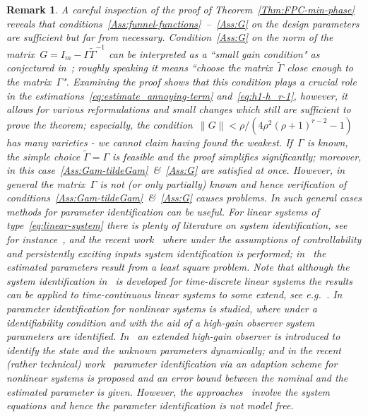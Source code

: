 \documentclass[ envcountsect, envcountsame]{svjour3}
\newtheorem{Remark}[Theorem]{Remark}
\begin{document}
\begin{Remark}
A careful inspection of the proof of Theorem~\ref{Thm:FPC-min-phase} reveals that conditions~\ref{Ass:funnel-functions}~--~\ref{Ass:G} on the design parameters
are sufficient but far from necessary.
Condition~\ref{Ass:G} on the norm of the matrix~${G = I_m -  \Gamma \tilde \Gamma^{-1}}$ can be interpreted as a ``small gain condition" 
as conjectured in~\cite[Rem. 4]{BergReis18b}; roughly speaking it means ``choose the matrix~$\tilde \Gamma$ close enough to the matrix~$\Gamma$".
Examining the proof shows that this condition plays a crucial role in the estimations~\eqref{eq:estimate_annoying-term} and~\eqref{eq:h1-h_r-1}, however, it allows for various reformulations and small changes which still are sufficient to prove the theorem; especially, the condition~$\|G\| < \rho/(4\rho^2(\rho+1)^{r-2} -1)$ has many varieties - we cannot claim having found the weakest.
If~$\Gamma$ is known, the simple choice $\tilde  \Gamma = \Gamma$ is feasible and the proof simplifies significantly; moreover, in this case~\ref{Ass:Gam-tildeGam}~\&~\ref{Ass:G} are satisfied at once.
%
However, in general the matrix~$\Gamma$ is not (or only partially) known and hence verification of conditions~\ref{Ass:Gam-tildeGam}~\&~\ref{Ass:G} causes problems.
In such general cases methods for parameter identification can be useful. 
For linear systems of type~\eqref{eq:linear-system} there is plenty of literature on system identification, see for instance~\cite{RaoSiva82,BingSinh90}, and the recent work~\cite{WaarPers20} where under the assumptions of controllability and persistently exciting inputs system identification is performed; in~\cite{ZhenLi21} the estimated parameters result from a least square problem.
Note that although the system identification in~\cite{WaarPers20,ZhenLi21} is developed for time-discrete linear systems the results can be applied to time-continuous linear systems to some extend, see e.g.~\cite[Sec.~1]{BingSinh90}.
In~\cite{FlorPont02} parameter identification for nonlinear systems is studied, where under a identifiability condition and with the aid of a high-gain observer system parameters are identified.
In~\cite{FarzMena15} an extended high-gain observer is introduced to identify the state and the unknown parameters dynamically; and
in the recent (rather technical) work~\cite{KaltNguy21} parameter identification via an adaption scheme for nonlinear systems is proposed and an error bound between the nominal and the estimated parameter is given.
However, the approaches~\cite{FlorPont02,FarzMena15,KaltNguy21} involve the system equations and hence the parameter identification is not model free.

\end{Remark}
\end{document}
